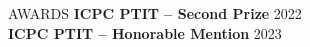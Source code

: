 \documentclass{resume}
\begin{document}
\begin{rSection}{AWARDS} 
\textbf{ICPC PTIT -- Second Prize} \hfill 2022\\
\textbf{ICPC PTIT -- Honorable Mention} \hfill 2023\\

\end{rSection}
\end{document}
